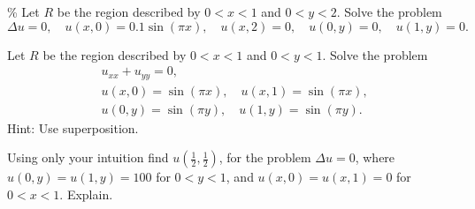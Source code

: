\documentclass{ximera}
\begin{document}
\begin{exercise}\%
    Let $R$ be the region described by $0 < x < 1$ and $0 < y < 2$. Solve the problem
    \begin{equation*}
        \Delta u = 0, \quad u(x,0) = 0.1 \sin (\pi x), \quad u(x,2) = 0, \quad u(0,y) = 0, \quad u(1,y) = 0 .
    \end{equation*}
\end{exercise}


\begin{exercise}
    Let $R$ be the region described by $0 < x < 1$ and $0 < y < 1$. Solve the problem
    \begin{align*}
        & u_{xx} + u_{yy} = 0, \\
        & u(x,0) = \sin (\pi x), \quad u(x,1) = \sin (\pi x), \\
        & u(0,y) = \sin (\pi y), \quad u(1,y) = \sin (\pi y) .
    \end{align*}
    Hint: Use superposition.
\end{exercise}

\begin{exercise}%
    Using only your intuition find $u(\frac{1}{2},\frac{1}{2})$, for the problem $\Delta u = 0$, where $u(0,y) = u(1,y) = 100$ for $0 < y < 1$, and $u(x,0) = u(x,1) = 0$ for $0 < x < 1$.  Explain.
\end{exercise}





%
\end{document}
